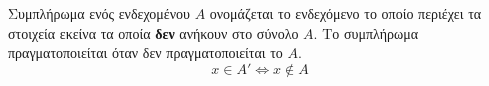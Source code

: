 Συμπλήρωμα ενός ενδεχομένου $ A $ ονομάζεται το ενδεχόμενο το οποίο περιέχει τα στοιχεία εκείνα τα οποία \textbf{δεν} ανήκουν στο σύνολο $ A $. Το συμπλήρωμα πραγματοποιείται όταν δεν πραγματοποιείται το $ A $. \[ x\in A'\Leftrightarrow x\notin A\]
